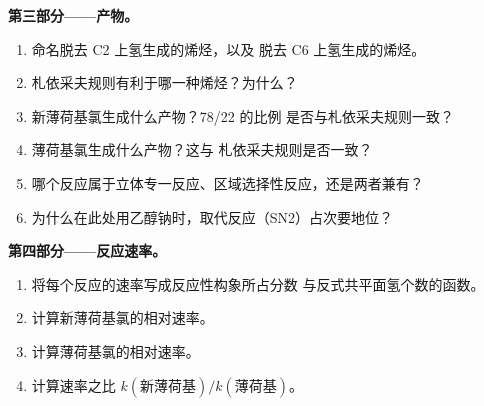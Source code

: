 \begin{problem}
\medskip
\noindent\textbf{第三部分——产物。}
\begin{enumerate}[resume]
  \item 命名脱去 C2 上氢生成的烯烃，以及
        脱去 C6 上氢生成的烯烃。
  \item 札依采夫规则有利于哪一种烯烃？为什么？
  \item 新薄荷基氯生成什么产物？78/22 的比例
        是否与札依采夫规则一致？
  \item 薄荷基氯生成什么产物？这与
        札依采夫规则是否一致？
  \item 哪个反应属于立体专一反应、区域选择性反应，还是两者兼有？
  \item 为什么在此处用乙醇钠时，取代反应（SN2）占次要地位？
\end{enumerate}

\medskip
\noindent\textbf{第四部分——反应速率。}
\begin{enumerate}[resume]
  \item 将每个反应的速率写成反应性构象所占分数
        与反式共平面氢个数的函数。
  \item 计算新薄荷基氯的相对速率。
  \item 计算薄荷基氯的相对速率。
  \item 计算速率之比 $k(\text{新薄荷基})/k(\text{薄荷基})$。
\end{enumerate}
\end{problem}
